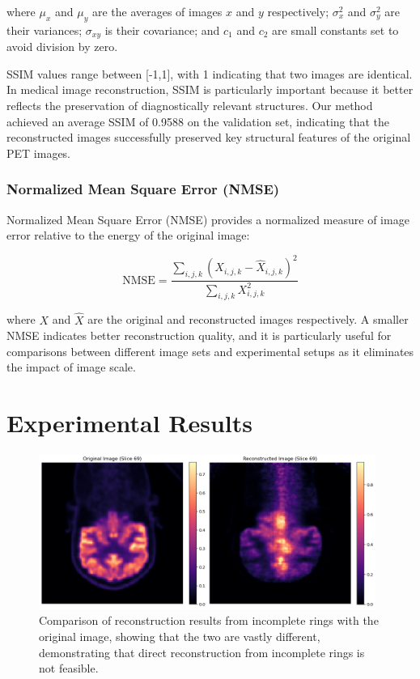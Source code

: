 \documentclass[
reprint,
superscriptaddress,
nofootinbib,
amsmath,amssymb,
aps,
prd,
]{revtex4-2}
\begin{document}
where $\mu_x$ and $\mu_y$ are the averages of images $x$ and $y$ respectively; $\sigma_x^2$ and $\sigma_y^2$ are their variances; $\sigma_{xy}$ is their covariance; and $c_1$ and $c_2$ are small constants set to avoid division by zero.

SSIM values range between [-1,1], with 1 indicating that two images are identical. In medical image reconstruction, SSIM is particularly important because it better reflects the preservation of diagnostically relevant structures. Our method achieved an average SSIM of 0.9588 on the validation set, indicating that the reconstructed images successfully preserved key structural features of the original PET images.

\subsubsection{Normalized Mean Square Error (NMSE)}

Normalized Mean Square Error (NMSE) provides a normalized measure of image error relative to the energy of the original image:

\begin{equation}
\text{NMSE} = \frac{\sum_{i,j,k}(X_{i,j,k} - \hat{X}_{i,j,k})^2}{\sum_{i,j,k}X_{i,j,k}^2}
\end{equation}

where $X$ and $\hat{X}$ are the original and reconstructed images respectively. A smaller NMSE indicates better reconstruction quality, and it is particularly useful for comparisons between different image sets and experimental setups as it eliminates the impact of image scale.




\section{Experimental Results}

\label{chap:results}



\begin{figure}[htbp]
    \centering
    \vspace{-0.2cm}
    \includegraphics[width=0.98\textwidth]{Images/output2}
    \vspace{-0.2cm}
    \caption{Comparison of reconstruction results from incomplete rings with the original image, showing that the two are vastly different, demonstrating that direct reconstruction from incomplete rings is not feasible.}
    \vspace{-0.2cm}
    \label{fig:pet_incomplete_reconstruction}
\end{figure}
\end{document}
